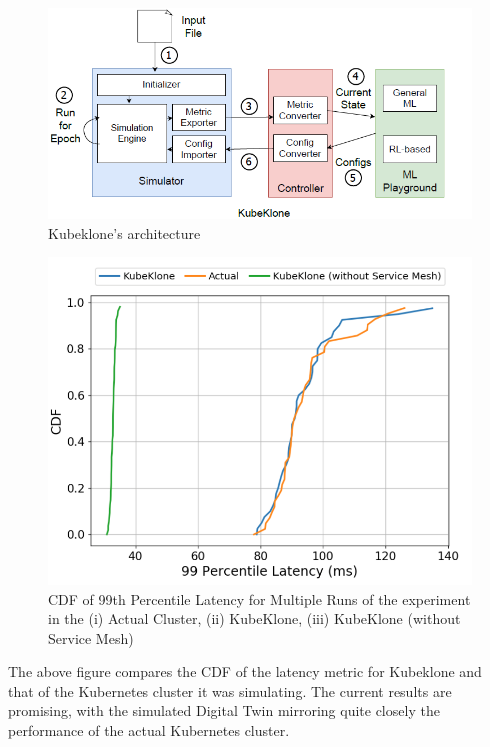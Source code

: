 \begin{figure}[h]
    \centering
    \includegraphics[width=1\linewidth]{resources/kubeklone_architecture.png}
    \caption{Kubeklone's architecture \cite{bhardwaj_kubeklone_2023}}
    \label{fig:kubeklone-architecture}
\end{figure}



\newpage 

\begin{figure}[h]
    \centering
    \includegraphics[width=0.7\linewidth]{resources/kubeklone_simulation_results.png}
    \caption{CDF of 99th Percentile Latency for Multiple Runs of the experiment in the (i) Actual Cluster, (ii) KubeKlone, (iii) KubeKlone (without Service Mesh) \cite{bhardwaj_kubeklone_2023}}
    \label{fig:kubeklone-simulation-results}
\end{figure}



The above figure compares the CDF of the latency metric for Kubeklone and that of the Kubernetes cluster it was simulating. The current results are promising, with the simulated Digital Twin mirroring quite closely the performance of the actual Kubernetes cluster.

